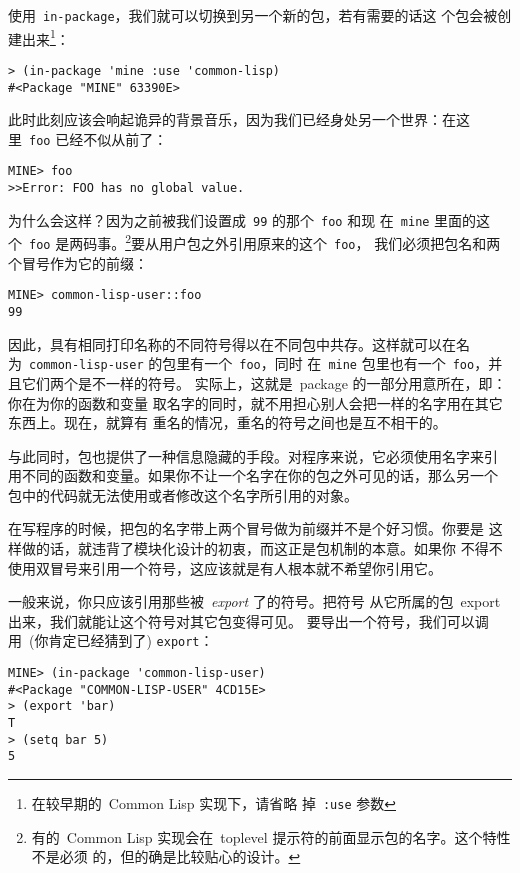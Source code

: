 使用~\texttt{in-package}，我们就可以切换到另一个新的包，若有需要的话这
个包会被创建出来\footnote{在较早期的~Common Lisp 实现下，请省略
  掉~\texttt{:use} 参数}：
\begin{verbatim}
> (in-package 'mine :use 'common-lisp)
#<Package "MINE" 63390E>
\end{verbatim}
此时此刻应该会响起诡异的背景音乐，因为我们已经身处另一个世界：在这
里~\texttt{foo} 已经不似从前了：
\begin{verbatim}
MINE> foo
>>Error: FOO has no global value.
\end{verbatim}
为什么会这样？因为之前被我们设置成~\texttt{99} 的那个~\texttt{foo} 和现
在~\texttt{mine} 里面的这个~\texttt{foo} 是两码事。\footnote{有的~Common
  Lisp 实现会在~toplevel 提示符的前面显示包的名字。这个特性不是必须
  的，但的确是比较贴心的设计。}要从用户包之外引用原来的这个~\texttt{foo}，
我们必须把包名和两个冒号作为它的前缀：
\begin{verbatim}
MINE> common-lisp-user::foo
99
\end{verbatim}

因此，具有相同打印名称的不同符号得以在不同包中共存。这样就可以在名
为~\texttt{common-lisp-user} 的包里有一个~\texttt{foo}，同时
在~\texttt{mine} 包里也有一个~\texttt{foo}，并且它们两个是不一样的符号。
实际上，这就是~package 的一部分用意所在，即：你在为你的函数和变量
取名字的同时，就不用担心别人会把一样的名字用在其它东西上。现在，就算有
重名的情况，重名的符号之间也是互不相干的。

与此同时，包也提供了一种信息隐藏的手段。对程序来说，它必须使用名字来引
用不同的函数和变量。如果你不让一个名字在你的包之外可见的话，那么另一个
包中的代码就无法使用或者修改这个名字所引用的对象。

在写程序的时候，把包的名字带上两个冒号做为前缀并不是个好习惯。你要是
这样做的话，就违背了模块化设计的初衷，而这正是包机制的本意。如果你
不得不使用双冒号来引用一个符号，这应该就是有人根本就不希望你引用它。

一般来说，你只应该引用那些被~\emph{export} 了的符号。把符号
从它所属的包~export 出来，我们就能让这个符号对其它包变得可见。
要导出一个符号，我们可以调用~(你肯定已经猜到了) \texttt{export}：
\begin{verbatim}
MINE> (in-package 'common-lisp-user)
#<Package "COMMON-LISP-USER" 4CD15E>
> (export 'bar)
T
> (setq bar 5)
5
\end{verbatim}

